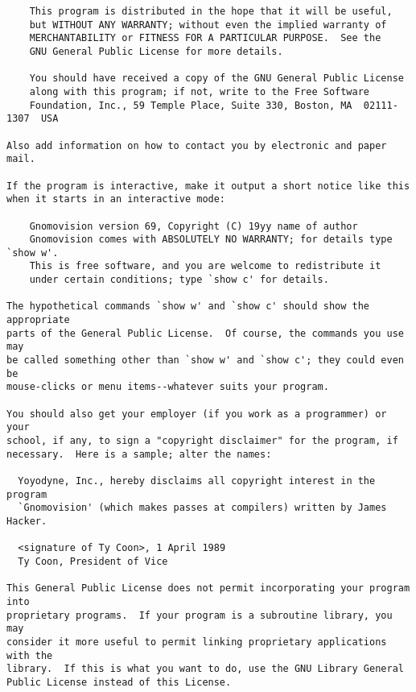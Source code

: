 \documentclass{article}
\begin{document}
\begin{appendix}
\begin{verbatim}
    This program is distributed in the hope that it will be useful,
    but WITHOUT ANY WARRANTY; without even the implied warranty of
    MERCHANTABILITY or FITNESS FOR A PARTICULAR PURPOSE.  See the
    GNU General Public License for more details.

    You should have received a copy of the GNU General Public License
    along with this program; if not, write to the Free Software
    Foundation, Inc., 59 Temple Place, Suite 330, Boston, MA  02111-1307  USA

Also add information on how to contact you by electronic and paper mail.

If the program is interactive, make it output a short notice like this
when it starts in an interactive mode:

    Gnomovision version 69, Copyright (C) 19yy name of author
    Gnomovision comes with ABSOLUTELY NO WARRANTY; for details type `show w'.
    This is free software, and you are welcome to redistribute it
    under certain conditions; type `show c' for details.

The hypothetical commands `show w' and `show c' should show the appropriate
parts of the General Public License.  Of course, the commands you use may
be called something other than `show w' and `show c'; they could even be
mouse-clicks or menu items--whatever suits your program.

You should also get your employer (if you work as a programmer) or your
school, if any, to sign a "copyright disclaimer" for the program, if
necessary.  Here is a sample; alter the names:

  Yoyodyne, Inc., hereby disclaims all copyright interest in the program
  `Gnomovision' (which makes passes at compilers) written by James Hacker.

  <signature of Ty Coon>, 1 April 1989
  Ty Coon, President of Vice

This General Public License does not permit incorporating your program into
proprietary programs.  If your program is a subroutine library, you may
consider it more useful to permit linking proprietary applications with the
library.  If this is what you want to do, use the GNU Library General
Public License instead of this License.

\end{verbatim}
\normalsize
\end{appendix}


\end{document}

